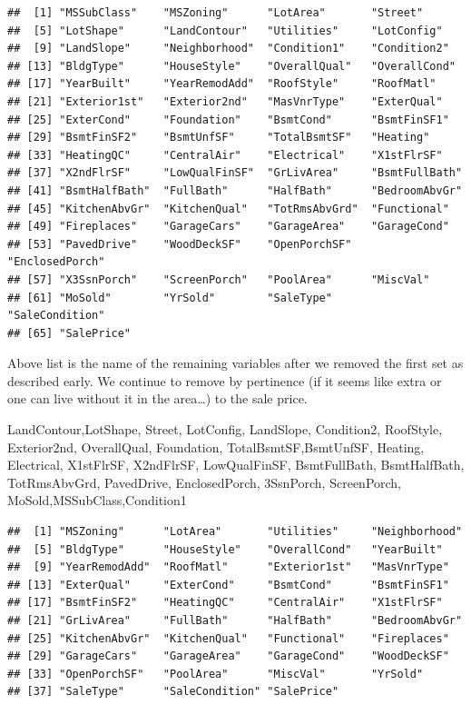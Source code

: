 \documentclass[
]{article}
\begin{document}
\begin{verbatim}
##  [1] "MSSubClass"    "MSZoning"      "LotArea"       "Street"       
##  [5] "LotShape"      "LandContour"   "Utilities"     "LotConfig"    
##  [9] "LandSlope"     "Neighborhood"  "Condition1"    "Condition2"   
## [13] "BldgType"      "HouseStyle"    "OverallQual"   "OverallCond"  
## [17] "YearBuilt"     "YearRemodAdd"  "RoofStyle"     "RoofMatl"     
## [21] "Exterior1st"   "Exterior2nd"   "MasVnrType"    "ExterQual"    
## [25] "ExterCond"     "Foundation"    "BsmtCond"      "BsmtFinSF1"   
## [29] "BsmtFinSF2"    "BsmtUnfSF"     "TotalBsmtSF"   "Heating"      
## [33] "HeatingQC"     "CentralAir"    "Electrical"    "X1stFlrSF"    
## [37] "X2ndFlrSF"     "LowQualFinSF"  "GrLivArea"     "BsmtFullBath" 
## [41] "BsmtHalfBath"  "FullBath"      "HalfBath"      "BedroomAbvGr" 
## [45] "KitchenAbvGr"  "KitchenQual"   "TotRmsAbvGrd"  "Functional"   
## [49] "Fireplaces"    "GarageCars"    "GarageArea"    "GarageCond"   
## [53] "PavedDrive"    "WoodDeckSF"    "OpenPorchSF"   "EnclosedPorch"
## [57] "X3SsnPorch"    "ScreenPorch"   "PoolArea"      "MiscVal"      
## [61] "MoSold"        "YrSold"        "SaleType"      "SaleCondition"
## [65] "SalePrice"
\end{verbatim}

Above list is the name of the remaining variables after we removed the
first set as described early. We continue to remove by pertinence (if it
seems like extra or one can live without it in the area\ldots) to the
sale price.

LandContour,LotShape, Street, LotConfig, LandSlope, Condition2,
RoofStyle, Exterior2nd, OverallQual, Foundation, TotalBsmtSF,BsmtUnfSF,
Heating, Electrical, X1stFlrSF, X2ndFlrSF, LowQualFinSF, BsmtFullBath,
BsmtHalfBath, TotRmsAbvGrd, PavedDrive, EnclosedPorch, 3SsnPorch,
ScreenPorch, MoSold,MSSubClass,Condition1

\begin{verbatim}
##  [1] "MSZoning"      "LotArea"       "Utilities"     "Neighborhood" 
##  [5] "BldgType"      "HouseStyle"    "OverallCond"   "YearBuilt"    
##  [9] "YearRemodAdd"  "RoofMatl"      "Exterior1st"   "MasVnrType"   
## [13] "ExterQual"     "ExterCond"     "BsmtCond"      "BsmtFinSF1"   
## [17] "BsmtFinSF2"    "HeatingQC"     "CentralAir"    "X1stFlrSF"    
## [21] "GrLivArea"     "FullBath"      "HalfBath"      "BedroomAbvGr" 
## [25] "KitchenAbvGr"  "KitchenQual"   "Functional"    "Fireplaces"   
## [29] "GarageCars"    "GarageArea"    "GarageCond"    "WoodDeckSF"   
## [33] "OpenPorchSF"   "PoolArea"      "MiscVal"       "YrSold"       
## [37] "SaleType"      "SaleCondition" "SalePrice"
\end{verbatim}
\end{document}
